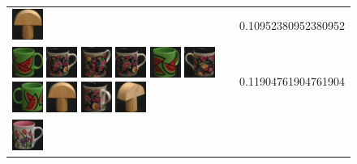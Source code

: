 \begin{figure}[tbp]
\begin{center}
\begin{tabular}{m{11cm} | m{3cm} |}
\includegraphics[width=1cm]{coil/beeld-1.eps}
& {\scriptsize 0.10952380952380952}
\\
\includegraphics[width=1cm]{coil/beeld-30.eps}
\includegraphics[width=1cm]{coil/beeld-60.eps}
\includegraphics[width=1cm]{coil/beeld-63.eps}
\includegraphics[width=1cm]{coil/beeld-60.eps}
\includegraphics[width=1cm]{coil/beeld-33.eps}
\includegraphics[width=1cm]{coil/beeld-61.eps}
\includegraphics[width=1cm]{coil/beeld-31.eps}
\includegraphics[width=1cm]{coil/beeld-1.eps}
\includegraphics[width=1cm]{coil/beeld-64.eps}
\includegraphics[width=1cm]{coil/beeld-3.eps}
& {\scriptsize 0.11904761904761904}
\\
\includegraphics[width=1cm]{coil/beeld-6.eps}

\end{tabular}
\end{center}
\end{figure}
